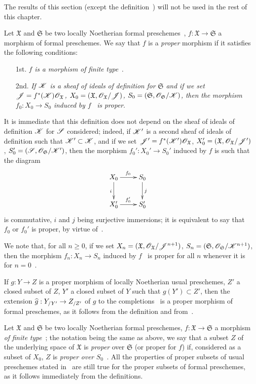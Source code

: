 The results of this section (except the definition~) will not be used in the rest of this chapter.

\begin{env}[3.4.1]
\label{3.3.4.1}
Let $\mathfrak{X}$ and $\mathfrak{S}$ be two locally Noetherian formal preschemes~, $f:\mathfrak{X}\to\mathfrak{S}$ a morphism of formal preschemes.
We say that $f$ is a \emph{proper} morphism if it satisfies the following conditions:
\begin{enumerate}
  \item[1st.] \emph{$f$ is a morphism of finite type~}.
  \item[2nd.] \emph{If $\mathscr{K}$ is a sheaf of ideals of definition for $\mathfrak{S}$ and if we set $\mathscr{J}=f^*(\mathscr{K})\mathscr{O}_\mathfrak{X}$, $X_0=(\mathfrak{X},\mathscr{O}_\mathfrak{X}/\mathscr{J})$, $S_0=(\mathfrak{S},\mathscr{O}_\mathfrak{S}/\mathscr{K})$, then the morphism $f_0:X_0\to S_0$ induced by $f$~ is proper}.
\end{enumerate}
It is immediate that this definition does not depend on the sheaf of ideals of definition $\mathscr{K}$ for $\mathscr{S}$ considered; indeed, if $\mathscr{K}'$ is a second sheaf of ideals of definition such that $\mathscr{K}'\subset\mathscr{K}$, and if we set $\mathscr{J}'=f^*(\mathscr{K}')\mathscr{O}_\mathfrak{X}$, $X_0'=(\mathfrak{X},\mathscr{O}_\mathfrak{X}/\mathscr{J}')$, $S_0'=(\mathscr{S},\mathscr{O}_\mathfrak{S}/\mathscr{K}')$, then the morphism $f_0':X_0'\to S_0'$ induced by $f$ is such that the diagram
\[
  \xymatrix{
    X_0\ar[r]^{f_0}\ar[d]_i &
    S_0\ar[d]^j\\
    X_0'\ar[r]^{f_0'} &
    S_0'
  }
\]
is commutative, $i$ and $j$ being surjective immersions; it is equivalent to say that $f_0$ or $f_0'$ is proper, by virtue of~.

We note that, for all $n\geq 0$, if we set $X_n=(\mathfrak{X},\mathscr{O}_\mathfrak{X}/\mathscr{J}^{n+1})$, $S_n=(\mathfrak{S},\mathscr{O}_\mathfrak{S}/\mathscr{K}^{n+1})$, then the morphism $f_n:X_n\to S_n$ induced by $f$~ is proper for all $n$ whenever it is for $n=0$~.

If $g:Y\to Z$ is a proper morphism of locally Noetherian usual preschemes, $Z'$ a closed subset of $Z$, $Y'$ a closed subset of $Y$ such that $g(Y')\subset Z'$, then the extension $\wh{g}:Y_{/Y'}\to Z_{/Z'}$ of $g$ to the completions~ is a proper morphism of formal preschemes, as it follows from the definition and from~.

Let $\mathfrak{X}$ and $\mathfrak{S}$ be two locally Noetherian formal preschemes, $f:\mathfrak{X}\to\mathfrak{S}$ a morphism \emph{of finite type}~; the notation being the same as above, we say that a subset $Z$ of the underlying space of $\mathfrak{X}$ is \emph{proper} over $\mathfrak{S}$ (or proper for $f$) if, considered as a subset of $X_0$, $Z$ is \emph{proper over $S_0$}~.
All the properties of proper subsets of usual preschemes stated in~ are still true for the proper subsets of formal preschemes, as it follows immediately from the definitions.
\end{env}


